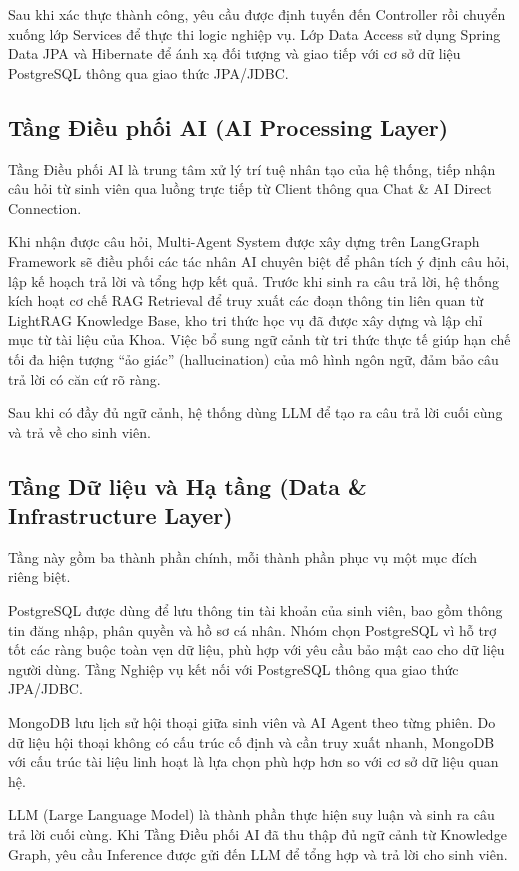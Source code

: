 Sau khi xác thực thành công, yêu cầu được định tuyến đến Controller rồi chuyển xuống lớp Services để thực thi logic nghiệp vụ. Lớp Data Access sử dụng Spring Data JPA và Hibernate để ánh xạ đối tượng và giao tiếp với cơ sở dữ liệu PostgreSQL thông qua giao thức JPA/JDBC.

\subsection{Tầng Điều phối AI (AI Processing Layer)}

Tầng Điều phối AI là trung tâm xử lý trí tuệ nhân tạo của hệ thống, tiếp nhận câu hỏi từ sinh viên qua luồng trực tiếp từ Client thông qua Chat \& AI Direct Connection.

Khi nhận được câu hỏi, Multi-Agent System được xây dựng trên LangGraph Framework sẽ điều phối các tác nhân AI chuyên biệt để phân tích ý định câu hỏi, lập kế hoạch trả lời và tổng hợp kết quả. Trước khi sinh ra câu trả lời, hệ thống kích hoạt cơ chế RAG Retrieval để truy xuất các đoạn thông tin liên quan từ LightRAG Knowledge Base, kho tri thức học vụ đã được xây dựng và lập chỉ mục từ tài liệu của Khoa. Việc bổ sung ngữ cảnh từ tri thức thực tế giúp hạn chế tối đa hiện tượng ``ảo giác'' (hallucination) của mô hình ngôn ngữ, đảm bảo câu trả lời có căn cứ rõ ràng.

Sau khi có đầy đủ ngữ cảnh, hệ thống dùng LLM để tạo ra câu trả lời cuối cùng và trả về cho sinh viên.

\subsection{Tầng Dữ liệu và Hạ tầng (Data \& Infrastructure Layer)}

Tầng này gồm ba thành phần chính, mỗi thành phần phục vụ một mục đích riêng biệt.

PostgreSQL được dùng để lưu thông tin tài khoản của sinh viên, bao gồm thông tin đăng nhập, phân quyền và hồ sơ cá nhân. Nhóm chọn PostgreSQL vì hỗ trợ tốt các ràng buộc toàn vẹn dữ liệu, phù hợp với yêu cầu bảo mật cao cho dữ liệu người dùng. Tầng Nghiệp vụ kết nối với PostgreSQL thông qua giao thức JPA/JDBC.

MongoDB lưu lịch sử hội thoại giữa sinh viên và AI Agent theo từng phiên. Do dữ liệu hội thoại không có cấu trúc cố định và cần truy xuất nhanh, MongoDB với cấu trúc tài liệu linh hoạt là lựa chọn phù hợp hơn so với cơ sở dữ liệu quan hệ.

LLM (Large Language Model) là thành phần thực hiện suy luận và sinh ra câu trả lời cuối cùng. Khi Tầng Điều phối AI đã thu thập đủ ngữ cảnh từ Knowledge Graph, yêu cầu Inference được gửi đến LLM để tổng hợp và trả lời cho sinh viên.

